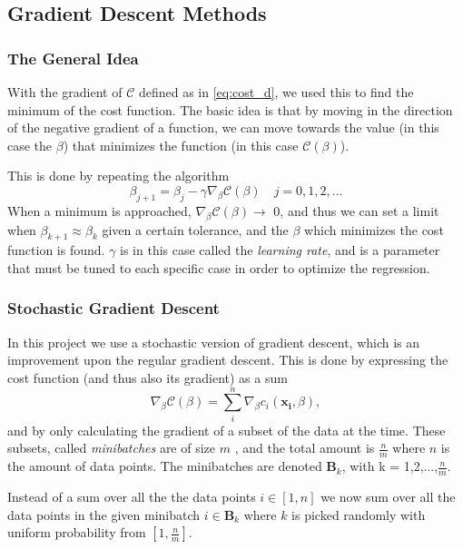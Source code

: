 \subsection{Gradient Descent Methods}
\subsubsection*{The General Idea}
With the gradient of $\mathcal{C}$ defined as in \eqref{eq:cost_d}, we used this to find the minimum of the cost function. The basic idea is that by moving in the direction of the negative gradient of a function, we can move towards the value (in this case the $\beta$) that minimizes the function (in this case $\mathcal{C}(\beta)$). \cite{GDLectures}

This is done by repeating the algorithm
\begin{equation}
    \beta_{j+1} = \beta_j - \gamma \nabla_\beta \mathcal{C}(\beta) \quad j = 0,1,2,...
    \label{eq:gradient_decent}
\end{equation}
When a minimum is approached, $\nabla_\beta \mathcal{C}(\beta) \rightarrow$ 0, and thus we can set a limit when $\beta_{k+1} \approx \beta_k$ given a certain tolerance, and the $\beta$ which minimizes the cost function is found. $\gamma$ is in this case called the \textit{learning rate}, and is a parameter that must be tuned to each specific case in order to optimize the regression.

\subsubsection*{Stochastic Gradient Descent}
In this project we use a stochastic version of gradient descent, which is an improvement upon the regular gradient descent. This is done by expressing the cost function (and thus also its gradient) as a sum
\begin{equation}
    \nabla_\beta \mathcal{C}(\beta) = \sum_i^n     \nabla_\beta c_i(\boldsymbol{x_i},\beta) ,
    \label{eq:gradient_sum}
\end{equation}
and by only calculating the gradient of a subset of the data at the time. These subsets, called \textit{minibatches} are of size $m$ , and the total amount is $\frac{n}{m}$ where $n$ is the amount of data points. The minibatches are denoted $\boldsymbol{B}_k$, with k = 1,2,...,$\frac{n}{m}$.

Instead of a sum over all the the data points $i \in [1,n]$ we now sum over all the data points in the given minibatch $i \in \boldsymbol{B}_k$ where $k$ is picked randomly with uniform probability from $[1, \frac{n}{m}]$.

